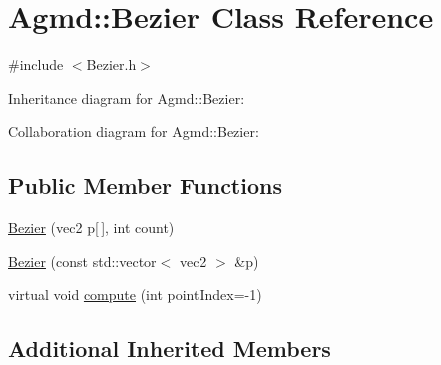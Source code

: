 \hypertarget{class_agmd_1_1_bezier}{\section{Agmd\+:\+:Bezier Class Reference}
\label{class_agmd_1_1_bezier}
}


{\ttfamily \#include $<$Bezier.\+h$>$}



Inheritance diagram for Agmd\+:\+:Bezier\+:


Collaboration diagram for Agmd\+:\+:Bezier\+:
\subsection*{Public Member Functions}
\begin{DoxyCompactItemize}
\item 
\hyperlink{class_agmd_1_1_bezier_a9a012d54dab518c11f2569b8322d54f6}{Bezier} (vec2 p\mbox{[}$\,$\mbox{]}, int count)
\item 
\hyperlink{class_agmd_1_1_bezier_a2091b1c4b42f73f2ae51f7b7f3de7fb6}{Bezier} (const std\+::vector$<$ vec2 $>$ \&p)
\item 
virtual void \hyperlink{class_agmd_1_1_bezier_ab2c80c0a53fa09b1bff334846e0b1d8e}{compute} (int point\+Index=-\/1)
\end{DoxyCompactItemize}
\subsection*{Additional Inherited Members}


